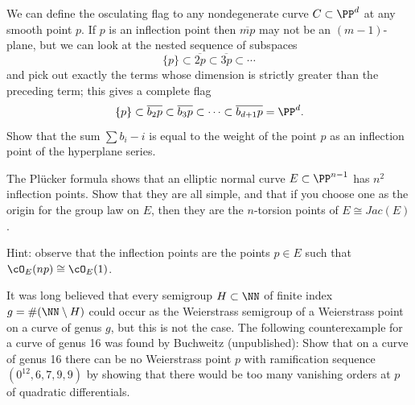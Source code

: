 \begin{exercise}
We can define the osculating flag to any nondegenerate curve $C \subset
\PP^d$ at any smooth point $p$. If $p$ is an inflection point then
$\overline{mp}$ may not be an $(m-1)$-plane, but we can look at the
nested sequence of subspaces
$$
\{p\} \subset \overline{2p} \subset \overline{3p} \subset \cdots
$$
and pick out exactly the terms whose dimension is strictly greater than
the preceding term; this gives a complete flag
$$
\{p\} \subset \overline{b_2p} \subset \overline{b_3p} \subset \dots
\subset \overline{b_{d+1}p} = \PP^d
.
$$
Show that the sum $\sum b_i - i$ is equal to the weight of the point $p$
as an inflection point of the hyperplane series.
\end{exercise}


\begin{exercise}
The Pl\"ucker formula shows that an elliptic normal curve $E\subset
\PP^{n-1}$ has $n^2$ inflection points. Show that they are
all simple, and that if you choose one as the origin for the group law
on $E$, then
they are the $n$-torsion points of  $E \cong Jac(E)$.

Hint: observe that the inflection points are the points $p \in E$ such
that $\cO_E(np) \cong \cO_E(1)$.
\end{exercise}

\begin{exercise}[Buchweitz]
It was long believed that every semigroup $H \subset \NN$ of finite index
%
$g = \#(\NN \setminus H)$ could occur as the Weierstrass semigroup of
a Weierstrass
point on a curve of genus $g$, but this is not the case. The following
counterexample for a curve of genus 16 was found by Buchweitz
%
(unpublished): Show that on a curve of genus 16 there can be no
Weierstrass point $p$ with ramification sequence
$(0^{12}, 6,7,9,9)$ by showing that there would be too many vanishing
orders at $p$ of quadratic differentials.
 \end{exercise}


